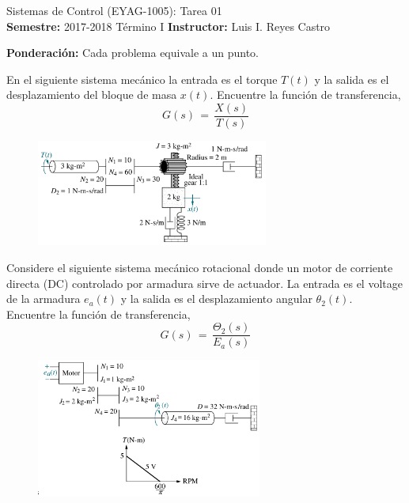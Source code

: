 \documentclass[ a4paper, twoside, 11pt]{article}
\newcommand{\numero}{01}
\begin{document}
\allowdisplaybreaks



\begin{center}
\Large Sistemas de Control (EYAG-1005): Tarea \numero \\[1ex]
\small \textbf{Semestre:} 2017-2018 T\'ermino I \qquad
\textbf{Instructor:} Luis I. Reyes Castro
\end{center}
\halfskip

\textbf{Ponderaci\'on:} Cada problema equivale a un punto. 
\fullskip

\begin{problem}
En el siguiente sistema mec\'anico la entrada es el torque $T(t)$ y la salida es el desplazamiento del bloque de masa $x(t)$. Encuentre la funci\'on de transferencia, \iec
\[
G(s) \, = \, 
\frac{X(s)}{T(s)}
\]
\begin{figure}[htb]
\centering
\includegraphics[width=0.68\textwidth]{figures/Nise_Prob-2-40.jpg}
\end{figure}

\end{problem}
\vspace{\baselineskip}

\begin{problem}
Considere el siguiente sistema mec\'anico rotacional donde un motor de corriente directa (DC) controlado por armadura sirve de actuador. La entrada es el voltage de la armadura $e_a(t)$ y la salida es el desplazamiento angular $\theta_2(t)$. Encuentre la funci\'on de transferencia, \iec
\[
G(s) \, = \, 
\frac{\Theta_2(s)}{E_a(s)}
\]
\begin{figure}[H]
\centering
\includegraphics[width=0.66\textwidth]{figures/Nise_Prob-2-43.jpg}
\end{figure}

\end{problem}
\vspace{\baselineskip}
\end{document}

